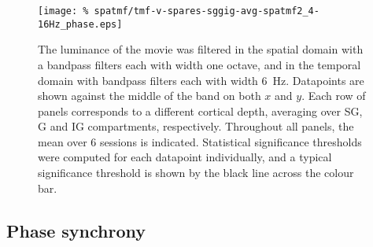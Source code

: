\begin{figure}[htbp]
\centering
    \texttt{[image: \%
spatmf/tmf-v-spares-sggig-avg-spatmf2\_4-16Hz\_phase.eps]}
\caption{%
The luminance of the movie was filtered in the spatial domain with a bandpass filters each with width one octave, and in the temporal domain with bandpass filters each with width \SI{6}{Hz}.
Datapoints are shown against the middle of the band on both $x$ and $y$.
Each row of panels corresponds to a different cortical depth, averaging over \ac{SG}, \ac{G} and \ac{IG} compartments, respectively.
Throughout all panels, the mean over \num{6} sessions is indicated.
Statistical significance thresholds were computed for each datapoint individually, and a typical significance threshold is shown by the black line across the colour bar.
}%
\label{fig:lam_phs_spatmf}
%
\end{figure}


\subsection{Phase synchrony}


